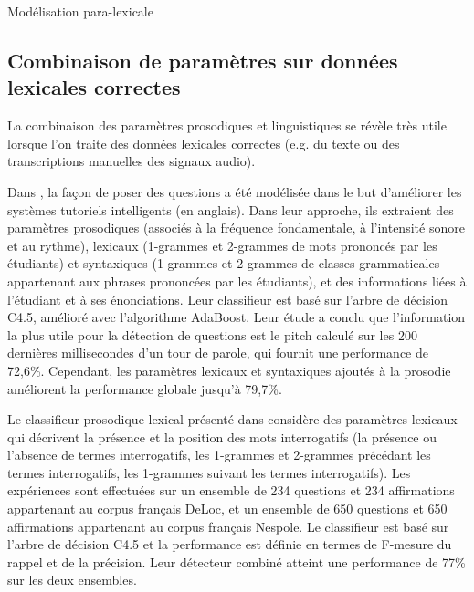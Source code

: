\documentclass{style/these}
\let\oldcite=\cite
\renewcommand{\cite}[1]{{\fontfamily{qcs}\selectfont{\color{darkerblue}[\oldcite{#1}]}}}
\begin{document}
\begin{part}{Modélisation para-lexicale}
\subsection*{Combinaison de paramètres sur données lexicales correctes}
\renewcommand{\rightmark}{Combinaison de paramètres sur données lexicales correctes}

La combinaison des paramètres prosodiques et linguistiques se révèle très utile lorsque l'on traite des données lexicales correctes (e.g. du texte ou des transcriptions manuelles des signaux audio).

Dans \cite{Liscombe:2006}, la façon de poser des questions a été modélisée dans le but d'améliorer les systèmes tutoriels intelligents (en anglais).
Dans leur approche, ils extraient des paramètres prosodiques (associés à la fréquence fondamentale, à l'intensité sonore et au rythme), lexicaux (1-grammes et 2-grammes de mots  prononcés par les étudiants) et syntaxiques (1-grammes et 2-grammes de classes grammaticales appartenant aux phrases prononcées par les étudiants), et des informations liées à l'étudiant et à ses énonciations. 
Leur classifieur est basé sur l'arbre de décision C4.5, amélioré avec l'algorithme AdaBoost.
Leur étude a conclu que l'information la plus utile pour la détection de questions est le pitch calculé sur les 200 dernières millisecondes d'un tour de parole, qui fournit une performance de 72,6\%.
Cependant, les paramètres lexicaux et syntaxiques ajoutés à la prosodie améliorent la performance globale jusqu'à 79,7\%.

Le classifieur prosodique-lexical présenté dans \cite{Quang:2007} considère des paramètres lexicaux qui décrivent la présence et la position des mots interrogatifs (la présence ou l'absence de termes interrogatifs, les 1-grammes et 2-grammes précédant les termes interrogatifs, les 1-grammes suivant les termes interrogatifs).
Les expériences sont effectuées sur un ensemble de 234 questions et 234 affirmations appartenant au corpus français DeLoc, et un ensemble de 650 questions et 650 affirmations appartenant au corpus français Nespole. 
Le classifieur est basé sur l'arbre de décision C4.5 et la performance est définie en termes de F-mesure du rappel et de la précision.
Leur détecteur combiné atteint une performance de 77\% sur les deux ensembles. 


\end{part}
\end{document}
